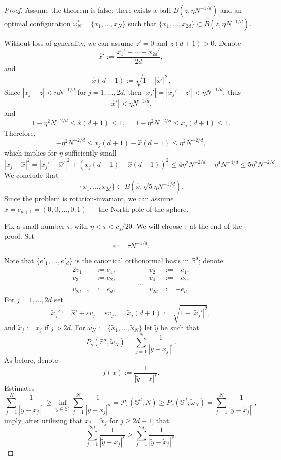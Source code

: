 \documentclass[12pt]{amsart}
\theoremstyle{definition}
\def\sli{\sum\limits}
\def\R{\mathbb{R}}
\def\ep{\varepsilon}
\newcommand{\1}{\mathbf{1}}
\newcommand{\PP}{\mathcal{P}}
\renewcommand\S{\mathbb{S}}
\begin{document}
\begin{proof}
Assume the theorem is false: there exists a ball $B(z, \eta N^{-1/d})$ and an optimal configuration $\omega^*_N=\{x_1, \ldots, x_N\}$ such that $\{x_1, \ldots, x_{2d}\}\subset  B(z, \eta N^{-1/d})$. 

Without loss of generality, we can assume $z'=0$ and $z(d+1)>0$. Denote
$$
\hat{x}':=\frac{x_1'+\cdots+x_{2d}'}{2d},
$$
and 
$$
\hat{x}(d+1):=\sqrt{1-|\hat{x}'|^2}.
$$
Since $|x_j-z|<\eta N^{-1/d}$ for $j=1, \ldots, 2d$, then $|x_j'|=|x_j'-z'|<\eta N^{-1/d}$; thus
$$
|\hat{x}'|<\eta N^{-1/d},
$$
and 
$$
1-\eta^2 N^{-2/d}\leqslant \hat{x}(d+1)\leqslant 1, \;\;\;\;\; 1-\eta^2 N^{-2/d}\leqslant x_j(d+1)\leqslant 1.
$$
Therefore, 
$$
-\eta^2 N^{-2/d}\leqslant x_j(d+1)-\hat{x}(d+1)\leqslant \eta^2 N^{-2/d},
$$
which implies for $\eta$ sufficiently small
$$
|x_j-\hat{x}|^2 = |x_j'-\hat{x}'|^2 + (x_j(d+1)-\hat{x}(d+1))^2 \leqslant 4\eta^2 N^{-2/d}+ \eta^4 N^{-4/d}\leqslant 5\eta^2 N^{-2/d}.
$$
We conclude that
$$
\{x_1, \ldots, x_{2d}\}\subset B(\hat{x}, \sqrt{5}\eta N^{-1/d}).
$$
Since the problem is rotation-invariant, we can assume $\hat{x}=e_{d+1}=(0, 0, \ldots, 0, 1)$ --- the North pole of the sphere. 

Fix a small number $\tau$, with $\eta < \tau < c_s/20$. We will choose $\tau$ at the end of the proof. Set
$$
\ep:=\tau N^{-1/d}.
$$

Note that $\{e'_1, \ldots, e'_d\}$ is the canonical orthonormal basis in $\R^d$; denote
\begin{alignat*}{2}
v_1&:=e_1, &  v_2&:=-e_1, \\
v_3&:=e_2, & v_4&:=-e_2, \\
& \qquad \qquad \qquad \ldots & \\
v_{2d-1}&:=e_d, & v_{2d}&:=-e_d.
\end{alignat*}
For $j=1, \ldots, 2d$ set 
$$
\tilde{x}_j':=\hat{x}'+\ep v_j=\ep v_j, \;\;\;\;\; \tilde{x}_j(d+1):=\sqrt{1-|\tilde{x}_j'|^2},
$$ 
and $\tilde{x}_j:=x_j$ if $j>2d$. For $\widetilde{\omega}_N:=\{\tilde{x}_1, \ldots, \tilde{x}_N\}$ let $\tilde{y}$ be such that 
$$
P_s(\mathbb{S}^d, \widetilde{\omega}_N) = \sli_{j=1}^N \frac{1}{|\tilde{y}-\tilde{x}_j|^s}.
$$
As before, denote
$$
f(x):=\frac{1}{|\tilde{y}-x|^s}.
$$ 
Estimates
\begin{equation}\label{mainineq}
\sli_{j=1}^N \frac{1}{|\tilde y-x_j|^s}\geqslant \inf_{y\in \S^d}\sli_{j=1}^N \frac{1}{|y-x_j|^s} =\PP_s(\S^d;N)\geqslant P_s(\S^d; \widetilde{\omega}_N)= \sli_{j=1}^N \frac{1}{|\tilde{y}-\tilde{x}_j|^s},
\end{equation}
imply, after utilizing that $x_j=\tilde{x}_j$ for $j\geqslant 2d+1$, that
\begin{equation}
\sli_{j=1}^{2d} \frac{1}{|\tilde y-x_j|^s}\geqslant \sli_{j=1}^{2d} \frac{1}{|\tilde{y}-\tilde{x}_j|^s}.
\end{equation}


\end{proof}
\end{document}
